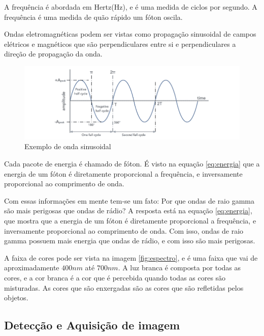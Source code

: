 \documentclass[12pt]{article}
\begin{document}
    A frequência é abordada em Hertz(Hz), e é uma medida de ciclos por segundo. A frequência é uma
    medida de quão rápido um fóton oscila.

    Ondas eletromagnéticas podem ser vistas como propagação sinusoidal de campos elétricos e magnéticos
que são perpendiculares entre si e perpendiculares a direção de propagação da onda.

    \begin{figure}[h]
    \begin{adjustwidth}{-5cm}{}
        \centering
        \includegraphics[]{images/15.png}
        \caption{Exemplo de onda sinusoidal}
        \label{fig:onda}
    \end{adjustwidth}
\end{figure}

    Cada pacote de energia é chamado de fóton. É visto na equação \ref{eq:energia} que a energia de um
    fóton é diretamente proporcional a frequência, e inversamente proporcional ao comprimento de onda.

    Com essas informações em mente tem-se um fato: Por que ondas de raio gamma são mais perigosas que
    ondas de rádio? A resposta está na equação \ref{eq:energia}, que mostra que a energia de um fóton
    é diretamente proporcional a frequência, e inversamente proporcional ao comprimento de onda. Com
    isso, ondas de raio gamma possuem mais energia que ondas de rádio, e com isso são mais perigosas.

    A faixa de cores pode ser vista na imagem \ref{fig:espectro}, e é uma faixa que vai de aproximadamente
    $400nm$ até $700nm$. A luz branca é composta por todas as cores, e a cor branca é a cor que é
    percebida quando todas as cores são misturadas. As cores que são enxergadas são as cores que são
    refletidas pelos objetos.

    \subsection{Detecção e Aquisição de imagem}
\end{document}
